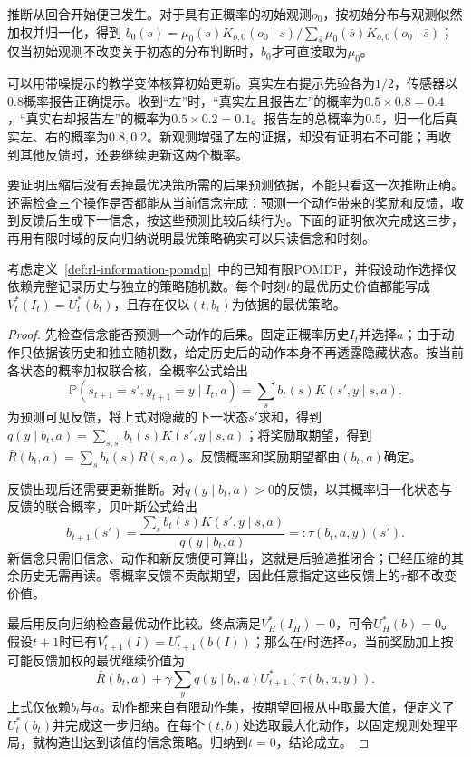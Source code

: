 推断从回合开始便已发生。对于具有正概率的初始观测$o_0$，按初始分布与观测似然加权并归一化，得到
$b_0(s)=\mu_0(s)K_{o,0}(o_0\mid s)/\sum_{\bar s}\mu_0(\bar s)K_{o,0}(o_0\mid\bar s)$；
仅当初始观测不改变关于初态的分布判断时，$b_0$才可直接取为$\mu_0$。

可以用带噪提示的教学变体核算初始更新。真实左右提示先验各为$1/2$，传感器以$0.8$概率报告正确提示。收到“左”时，“真实左且报告左”的概率为$0.5\times0.8=0.4$，“真实右却报告左”的概率为$0.5\times0.2=0.1$。报告左的总概率为$0.5$，归一化后真实左、右的概率为$0.8,0.2$。新观测增强了左的证据，却没有证明右不可能；再收到其他反馈时，还要继续更新这两个概率。

要证明压缩后没有丢掉最优决策所需的后果预测依据，不能只看这一次推断正确。还需检查三个操作是否都能从当前信念完成：预测一个动作带来的奖励和反馈，收到反馈后生成下一信念，按这些预测比较后续行为。下面的证明依次完成这三步，再用有限时域的反向归纳说明最优策略确实可以只读信念和时刻。

\begin{theorem}[精确信念对最优控制充分]
  \label{thm:rl-information-belief-sufficient}
  考虑定义~\ref{def:rl-information-pomdp}~中的已知有限POMDP，并假设动作选择仅依赖完整记录历史与独立的策略随机数。每个时刻$t$的最优历史价值都能写成$V_t^*(I_t)=U_t^*(b_t)$，且存在仅以$(t,b_t)$为依据的最优策略。
\end{theorem}

\begin{proof}
  先检查信念能否预测一个动作的后果。固定正概率历史$I_t$并选择$a$；由于动作只依据该历史和独立随机数，给定历史后的动作本身不再透露隐藏状态。按当前各状态的概率加权联合核，全概率公式给出
  \[
    \mathbb P(s_{t+1}=s',y_{t+1}=y\mid I_t,a)
    =\sum_s b_t(s)K(s',y\mid s,a).
  \]
  为预测可见反馈，将上式对隐藏的下一状态$s'$求和，得到
  $q(y\mid b_t,a)=\sum_{s,s'}b_t(s)K(s',y\mid s,a)$；将奖励取期望，得到
  $\bar R(b_t,a)=\sum_s b_t(s)R(s,a)$。反馈概率和奖励期望都由$(b_t,a)$确定。

  反馈出现后还需要更新推断。对$q(y\mid b_t,a)>0$的反馈，以其概率归一化状态与反馈的联合概率，贝叶斯公式给出
  \[
    b_{t+1}(s')
    =\frac{\sum_s b_t(s)K(s',y\mid s,a)}
           {q(y\mid b_t,a)}
    =:\tau(b_t,a,y)(s').
  \]
  新信念只需旧信念、动作和新反馈便可算出，这就是后验递推闭合；已经压缩的其余历史无需再读。零概率反馈不贡献期望，因此任意指定这些反馈上的$\tau$都不改变价值。

  最后用反向归纳检查最优动作比较。终点满足$V_H^*(I_H)=0$，可令$U_H^*(b)=0$。假设$t+1$时已有$V_{t+1}^*(I)=U_{t+1}^*(b(I))$；那么在$t$时选择$a$，当前奖励加上按可能反馈加权的最优继续价值为
  \[
    \bar R(b_t,a)
    +\gamma\sum_y q(y\mid b_t,a)
                      U_{t+1}^*(\tau(b_t,a,y)).
  \]
  上式仅依赖$b_t$与$a$。动作都来自有限动作集，按期望回报从中取最大值，便定义了$U_t^*(b_t)$并完成这一步归纳。在每个$(t,b)$处选取最大化动作，以固定规则处理平局，就构造出达到该值的信念策略。归纳到$t=0$，结论成立。
\end{proof}

